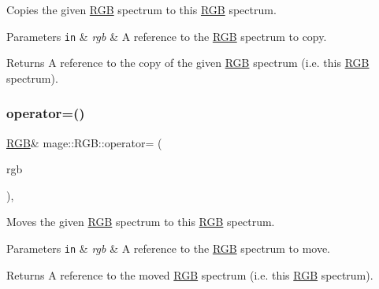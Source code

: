 Copies the given \mbox{\hyperlink{structmage_1_1_r_g_b}{R\+GB}} spectrum to this \mbox{\hyperlink{structmage_1_1_r_g_b}{R\+GB}} spectrum.


\begin{DoxyParams}[1]{Parameters}
\mbox{\tt in}  & {\em rgb} & A reference to the \mbox{\hyperlink{structmage_1_1_r_g_b}{R\+GB}} spectrum to copy. \\
\hline
\end{DoxyParams}
\begin{DoxyReturn}{Returns}
A reference to the copy of the given \mbox{\hyperlink{structmage_1_1_r_g_b}{R\+GB}} spectrum (i.\+e. this \mbox{\hyperlink{structmage_1_1_r_g_b}{R\+GB}} spectrum). 
\end{DoxyReturn}
\mbox{\label{structmage_1_1_r_g_b_add3b5995774c634d6e32af4d1cd6bfb3}} 
\subsubsection{\texorpdfstring{operator=()}{operator=()}\hspace{0.1cm}{\footnotesize\ttfamily [2/2]}}
{\footnotesize\ttfamily \mbox{\hyperlink{structmage_1_1_r_g_b}{R\+GB}}\& mage\+::\+R\+G\+B\+::operator= (\begin{DoxyParamCaption}\item[{\mbox{\hyperlink{structmage_1_1_r_g_b}{R\+GB}} \&\&}]{rgb }\end{DoxyParamCaption})\hspace{0.3cm}{\ttfamily [default]}, {\ttfamily [noexcept]}}

Moves the given \mbox{\hyperlink{structmage_1_1_r_g_b}{R\+GB}} spectrum to this \mbox{\hyperlink{structmage_1_1_r_g_b}{R\+GB}} spectrum.


\begin{DoxyParams}[1]{Parameters}
\mbox{\tt in}  & {\em rgb} & A reference to the \mbox{\hyperlink{structmage_1_1_r_g_b}{R\+GB}} spectrum to move. \\
\hline
\end{DoxyParams}
\begin{DoxyReturn}{Returns}
A reference to the moved \mbox{\hyperlink{structmage_1_1_r_g_b}{R\+GB}} spectrum (i.\+e. this \mbox{\hyperlink{structmage_1_1_r_g_b}{R\+GB}} spectrum). 
\end{DoxyReturn}
\mbox{\label{structmage_1_1_r_g_b_a363d6235bc2c68907addb5326df07dc7}} 
